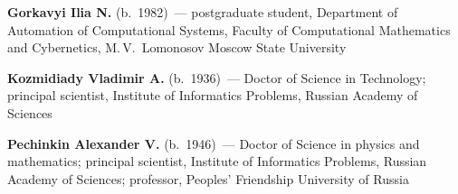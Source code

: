 \begin{multicols}{2}
\noindent
\textbf{Gorkavyi Ilia N.} (b.\ 1982)~--- postgraduate student,
Department of Automation of Computational Systems,
Faculty of  Computational
Mathematics and Cybernetics, M.\,V.~Lomonosov Moscow State University

\vspace*{3pt}

\noindent
\textbf{Kozmidiady Vladimir A.} (b.\ 1936)~--- Doctor of Science in Technology;
principal scientist, Institute of Informatics Problems,  Russian Academy of Sciences
\columnbreak









\noindent
\textbf{Pechinkin Alexander V.} (b.\ 1946)~--- Doctor of Science in physics and mathematics;
principal scientist, Institute of Informatics Problems, Russian Academy of
Sciences; professor, Peoples' Friendship University of Russia








\end{multicols}
